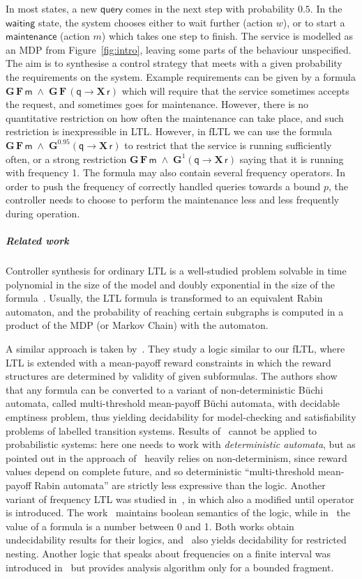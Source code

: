 \documentclass[a4paper,UKenglish]{lipics}
\newcommand{\Gf}[1]{\mathbf{G}^{#1}}
\newcommand{\X}{\mathbf{X}\,}
\newcommand{\G}{\mathbf{G}\,}
\newcommand{\F}{\mathbf{F}\,}
\newcommand{\ap}[1]{\ensuremath{\mathsf{#1}}}
\begin{document}
In most states, a new \ap{query} comes in the next step with probability $0.5$. In the \ap{waiting} state, the system chooses either to wait further (action $w$), or to start a \ap{maintenance} (action $m$) which takes one step to finish.
The service is modelled as an MDP from Figure~\ref{fig:intro}, leaving some parts of the behaviour unspecified. The aim is to synthesise a control strategy that meets with a given probability the requirements on the system. Example requirements can be given by a formula $ \G\F \ap{m} \;\land\; \G\F (\ap{q} \rightarrow \X \ap{r} )$ which will require that the service sometimes accepts the request, and sometimes goes for maintenance. However, there is no quantitative restriction on how often the maintenance can take place, and such restriction is inexpressible in LTL. However, in fLTL we can use the formula $ \G\F \ap{m} \;\land\; \Gf{0.95} (\ap{q} \rightarrow \X \ap{r} )$ to restrict
that the service is running sufficiently often, or a strong restriction $\G\F \ap{m} \;\land\; \Gf{1} (\ap{q} \rightarrow \X \ap{r} )$ saying that it is running with frequency 1. The formula may also contain several frequency operators.
In order to push the frequency of correctly handled queries towards a bound $p$, the controller needs to choose to perform the maintenance less and less frequently during operation.

\subparagraph{Related work}
Controller synthesis for ordinary LTL is a well-studied problem solvable in time polynomial in the size of the model and doubly exponential
in the size of the formula~\cite{BP08}. Usually, the LTL formula is transformed to an equivalent Rabin automaton, and
the probability of reaching certain subgraphs is computed in a product of the MDP (or Markov Chain) with the automaton. 


A similar approach is taken by~\cite{AT12}. They study a logic similar to our fLTL, where LTL is extended with a mean-payoff reward constraints
in which the reward structures are determined by validity of given subformulas. The authors show that any formula can be converted
to a variant of non-deterministic B\"uchi automata, called multi-threshold mean-payoff B\"uchi automata, with
decidable emptiness problem, thus yielding decidability for model-checking and
satisfiability problems of labelled transition systems. Results of~\cite{AT12} cannot be applied
to probabilistic systems:
here one needs to work with {\em deterministic automata},
but as pointed out in \cite[Section 4, Footnote 4]{AT12} the approach of~\cite{AT12} heavily relies on non-determinism, since reward values depend on complete future, and so deterministic ``multi-threshold mean-payoff Rabin automata'' are strictly less expressive than the logic.
Another variant of frequency LTL was studied in~\cite{BDL-tase12,BMM14}, in which also a modified until operator is introduced. 
The work~\cite{BDL-tase12} maintains boolean semantics of the logic, while in~\cite{BMM14} the value of a formula is a number between
0 and 1. Both works obtain undecidability results for their logics, and~\cite{BDL-tase12} also yields decidability for restricted nesting.
Another logic that speaks about frequencies on a finite interval was introduced in~\cite{DBLP:journals/corr/abs-1111-3111} but provides analysis algorithm only for a bounded fragment.
\end{document}
